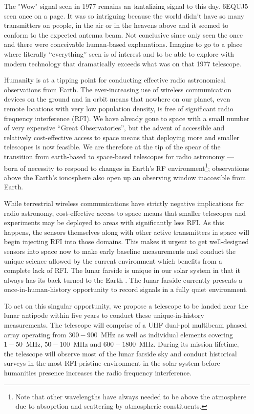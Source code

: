 The "Wow" signal seen in 1977 remains an tantalizing signal to this day.  6EQUJ5 seen once on a page.  It was so intriguing because the world didn't have so many transmitters on people, in the air or in the heavens above and it seemed to conform to the expected antenna beam.  Not conclusive since only seen the once and there were conceivable human-based explanations.  Imagine to go to a place where literally ``everything'' seen is of interest and to be able to explore with modern technology that dramatically exceeds what was on that 1977 telescope.  

Humanity is at a tipping point for conducting effective radio astronomical observations from Earth. The ever-increasing use of wireless communication devices on the ground and in orbit means that nowhere on our planet, even  remote locations with very low population density, is free of significant radio frequency interference (RFI). We have already gone to space with a small number of very expensive ``Great Observatories'', but the advent of accessible and relatively cost-effective access to space means that deploying more and smaller telescopes is now feasible. We are therefore at the tip of the spear of the transition from earth-based to space-based telescopes for radio astronomy --- born of necessity to respond to changes in Earth’s RF environment\footnote{Note that other wavelengths have always needed to be above the atmosphere due to absoprtion and scattering by atmospheric constituents.}; observations above the Earth's ionosphere also open up an observing window inaccesible from Earth.

While terrestrial wireless communications have strictly negative implications for radio astronomy, cost-effective access to space means that smaller telescopes and experiments may be deployed to areas with significantly less RFI. As this happens, the sensors themselves along with other active transmitters in space will begin injecting RFI into those domains. This makes it urgent to get well-designed sensors into space now to make early baseline measurements and conduct the unique science allowed by the current environment which benefits from a complete lack of RFI. The lunar farside is unique in our solar system in that it always has its back turned to the Earth \citep{heidmann2002,MACCONE2019233,michaud2020lunar}. The lunar farside currently presents a once-in-human-history opportunity to record signals in a fully quiet environment. 

To act on this singular opportunity, we propose a telescope to be landed near the lunar antipode within five years to conduct these unique-in-history measurements. The telescope will comprise of a UHF dual-pol multibeam phased array operating from $300-900$~MHz as well as individual elements covering $1-50$~MHz, $50-100$~MHz and $600-1800$~MHz. During its mission lifetime, the telescope will observe most of the lunar farside sky and conduct historical surveys in the most RFI-pristine environment in the solar system before humanities presence increases the radio frequency interference.
